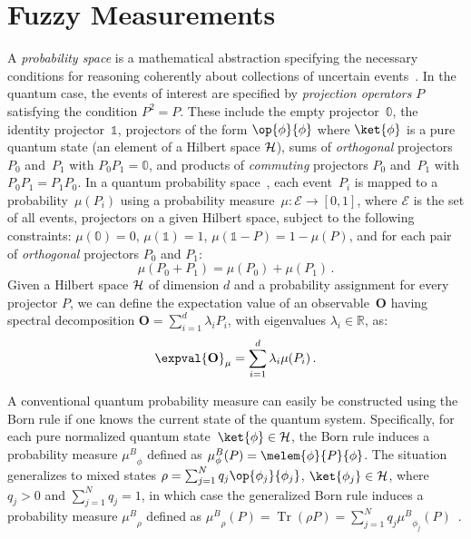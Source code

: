 \documentclass[english,reprint, aps, prl,superscriptaddress, showpacs,
showkeys, longbibliography, amsmath, amssymb, floatfix]{revtex4-1}
\theoremstyle{plain}
\theoremstyle{definition}
\newcommand{\events}{\ensuremath{\mathcal{E}}}
\newcommand{\proj}[1]{\op{#1}{#1}}
\newcommand{\Tr}{\ensuremath{\mathop{\mathrm{Tr}}\nolimits}}
\newcommand{\muB}{\ensuremath{\mu^{B}}}
\begin{document}
\section{Fuzzy Measurements}
\label{sec:fuzzy}

A \emph{probability space} is a mathematical abstraction specifying
the necessary conditions for reasoning coherently about collections of
uncertain
events~\cite{Kolmogorov1950bibTeX,544199,Griffiths2003,Grabisch2016}. In the
quantum case, the events of interest are specified by \emph{projection
  operators} $P$ satisfying the condition $P^2=P$. These include the
empty projector~$\mathbb{0}$, the identity projector~$\mathbb{1}$,
projectors of the form $\proj{\phi}$ where $\ket{\phi}$ is a pure
quantum state (an element of a Hilbert space ${\cal H}$), sums of
\emph{orthogonal} projectors~$P_0$ and~$P_1$ with $P_0P_1=\mathbb{0}$,
and products of \emph{commuting} projectors $P_0$ and~$P_1$ with
$P_0P_1=P_1P_0$. In a quantum probability
space~\cite{10.2307/2308516,gleason1957,Redhead1987-REDINA,Maassen2010,Abramsky2012},
each event~$P_{i}$ is mapped to a probability~$\mu(P_{i})$ using a
probability measure~$\mu:\events\rightarrow[0,1]$, where $\events$ is
the set of all events, projectors on a given Hilbert space, subject to the
following constraints: $\mu(\mathbb{0})=0$, $\mu(\mathbb{1})=1$,
$\mu\left(\mathbb{1}-P\right)=1-\mu\left(P\right)$, and for each pair
of \emph{orthogonal} projectors $P_{0}$ and $P_{1}$:
\begin{equation}
{\mu}\left(P_{0}+P_{1}\right)={\mu}\left(P_{0}\right)+{\mu}\left(P_{1}\right)\,.\label{eq:QuantumProbability-Addition}
\end{equation}
Given a Hilbert space ${\cal H}$ of dimension $d$ and a probability assignment
for every projector $P$, we can define the expectation value of an
observable~$\mathbf{O}$ having spectral decomposition
$\mathbf{O}=\sum_{i=1}^{d}\lambda_{i}P_{i}$, with eigenvalues $\lambda_i \in \mathbb{R}$, as:
\begin{equation}
\expval{\mathbf{O}}_{\mu}=\sum_{i=1}^{d}\lambda_{i}\mu(P_{i})\,.\label{eq:quantum-expectation}
\end{equation}

A conventional quantum probability measure can easily be constructed
using the Born rule if one knows the current state of the quantum
system.  Specifically, for each pure normalized quantum
state~$\ket{\phi} \in {\cal H}$, the Born rule induces a probability measure
$\muB_{\phi}$ defined as
$\muB_{\phi}(P)=\melem{\phi}{P}{\phi}$. The situation
generalizes to mixed states
$\rho = \sum_{j=1}^{N}q_{j}\proj{\phi_{j}}$, $\ket{\phi_j} \in {\cal H}$, where $q_j > 0$ and
$\sum_{j=1}^{N}q_{j}=1$, in which case the generalized Born rule
induces a probability measure $\muB_{\rho}$ defined as
$\muB_{\rho}\left(P\right) = \Tr\left(\rho P\right) =
\sum_{j=1}^{N}
q_{j}\muB_{\phi_{j}}\left(P\right)$~\citep{Born1983bibTeX,Mermin2007,Jaeger2007}.
\end{document}
